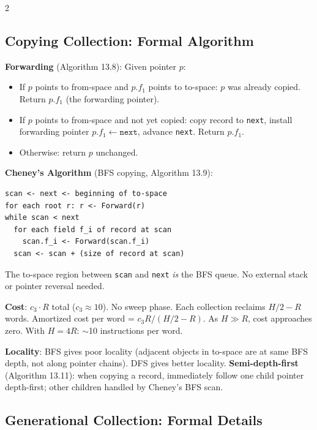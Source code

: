 \documentclass[9pt,landscape]{extarticle}
\begin{document}
\begin{multicols}{2}
\subsection{Copying Collection: Formal Algorithm}

\textbf{Forwarding} (Algorithm 13.8): Given pointer $p$:
\begin{itemize}
  \item If $p$ points to from-space and $p.f_1$ points to to-space: $p$ was already copied. Return $p.f_1$ (the forwarding pointer).
  \item If $p$ points to from-space and not yet copied: copy record to \texttt{next}, install forwarding pointer $p.f_1 \leftarrow \texttt{next}$, advance \texttt{next}. Return $p.f_1$.
  \item Otherwise: return $p$ unchanged.
\end{itemize}

\textbf{Cheney's Algorithm} (BFS copying, Algorithm 13.9):
\begin{lstlisting}
scan <- next <- beginning of to-space
for each root r: r <- Forward(r)
while scan < next
  for each field f_i of record at scan
    scan.f_i <- Forward(scan.f_i)
  scan <- scan + (size of record at scan)
\end{lstlisting}

The to-space region between \texttt{scan} and \texttt{next} \emph{is} the BFS queue. No external stack or pointer reversal needed.

\textbf{Cost}: $c_3 \cdot R$ total ($c_3 \approx 10$). No sweep phase. Each collection reclaims $H/2 - R$ words. Amortized cost per word = $c_3 R / (H/2 - R)$. As $H \gg R$, cost approaches zero. With $H = 4R$: $\sim$10 instructions per word.

\textbf{Locality}: BFS gives poor locality (adjacent objects in to-space are at same BFS depth, not along pointer chains). DFS gives better locality. \textbf{Semi-depth-first} (Algorithm 13.11): when copying a record, immediately follow one child pointer depth-first; other children handled by Cheney's BFS scan.

\subsection{Generational Collection: Formal Details}


\end{multicols}
\end{document}
